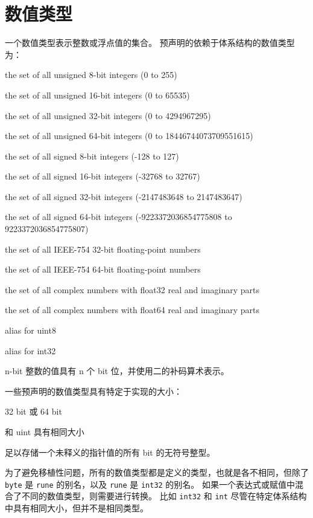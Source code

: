 \section{数值类型}
一个数值类型表示整数或浮点值的集合。
预声明的依赖于体系结构的数值类型为：
\begin{description}[leftmargin=4\parindent,style=sameline] %
\item[uint8]	   the set of all unsigned  8-bit integers (0 to 255)
\item[uint16]      the set of all unsigned 16-bit integers (0 to 65535)
\item[uint32]      the set of all unsigned 32-bit integers (0 to 4294967295)
\item[uint64]      the set of all unsigned 64-bit integers (0 to 18446744073709551615)
\item[int8]        the set of all signed  8-bit integers (-128 to 127)
\item[int16]       the set of all signed 16-bit integers (-32768 to 32767)
\item[int32]       the set of all signed 32-bit integers (-2147483648 to 2147483647)
\item[int64]       the set of all signed 64-bit integers (-9223372036854775808 to \\ 9223372036854775807)
\item[float32]     the set of all IEEE-754 32-bit floating-point numbers
\item[float64]     the set of all IEEE-754 64-bit floating-point numbers

\item[complex64]   the set of all complex numbers with float32 real and imaginary parts
\item[complex128]  the set of all complex numbers with float64 real and imaginary parts

\item[byte]        alias for uint8
\item[rune]        alias for int32
\end{description}
n-bit 整数的值具有 n 个 bit 位，并使用二的补码算术表示。

一些预声明的数值类型具有特定于实现的大小：
\begin{description}[font=\ttfamily\bfseries, style=sameline, leftmargin=4\parindent, labelindent=\parindent]
\item[uint] 32 bit 或 64 bit
\item[int] 和 uint 具有相同大小
\item[uintptr] 足以存储一个未释义的指针值的所有 bit 的无符号整型。
\end{description}
为了避免移植性问题，所有的数值类型都是定义的类型，也就是各不相同，但除了 \lstinline|byte| 是 \lstinline|rune| 的别名，以及 \lstinline|rune| 是 \lstinline|int32| 的别名。
如果一个表达式或赋值中混合了不同的数值类型，则需要进行转换。
比如 \lstinline|int32| 和 \lstinline|int| 尽管在特定体系结构中具有相同大小，但并不是相同类型。

